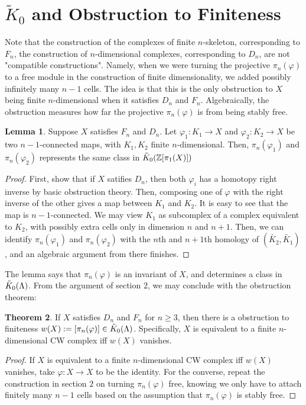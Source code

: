 \documentclass{article}
\theoremstyle{definition}
\newtheorem{theorem}{Theorem}[section]
\theoremstyle{definition}
\theoremstyle{definition}
\theoremstyle{definition}
\theoremstyle{definition}
\newtheorem{lemma}[theorem]{Lemma}
\theoremstyle{definition}
\theoremstyle{definition}
\begin{document}
\section{$\tilde{K}_0$ and Obstruction to Finiteness}


Note that the construction of the complexes of finite $n$-skeleton, corresponding to $F_n$, the construction of $n$-dimensional complexes, corresponding to $D_n$, are not "compatible constructions". Namely, when we were turning the projective $\pi_n(\varphi)$ to a free module in the construction of finite dimensionality, we added possibly infinitely many $n-1$ cells. The idea is that this is the only obstruction to $X$ being finite $n$-dimensional when it satisfies $D_n$ and $F_n$. Algebraically, the obstruction measures how far the projective $\pi_n(\varphi)$ is from being stably free.

\begin{tcolorbox}
\begin{lemma}
Suppose $X$ satisfies $F_n$ and $D_n$. Let $\varphi_1: K_1\to X$ and $\varphi_2: K_2\to X$ be two $n-1$-connected maps, with $K_1,K_2$ finite $n$-dimensional. Then, $\pi_n(\varphi_1)$ and $\pi_n(\varphi_2)$ represents the same class in $\Tilde{K}_0(\mathbb{Z}[\pi_1(X)])$
\end{lemma}
\end{tcolorbox}
\begin{proof}
  First, show that if $X$ satifies $D_n$, then both $\varphi_i$ has a homotopy right inverse by basic obstruction theory. Then, composing one of $\varphi$ with the right inverse of the other gives a map between $K_1$ and $K_2$. It is easy to see that the map is $n-1$-connected. We may view $K_1$ as subcomplex of a complex equivalent to $K_2$, with possibly extra cells only in dimension $n$ and $n+1$. Then, we can identify $\pi_n(\varphi_1)$ and $\pi_n(\varphi_2)$ with the $n$th and $n+1$th homology of $(\tilde{K_2},\tilde{K_1})$, and an algebraic argument from there finishes. 
\end{proof}

The lemma says that $\pi_n(\varphi)$ is an invariant of $X$, and determines a class in $\Tilde{K}_0(\Lambda)$. From the argument of section $2$, we may conclude with the obstruction theorem:
\begin{tcolorbox}[colback=red!5!white,colframe=red!30!white]
\begin{theorem}
If $X$ satisfies $D_n$ and $F_n$ for $n\geq 3$, then there is a obstruction to finiteness $w(X):=[\pi_n(\varphi)]\in \Tilde{K}_0(\Lambda)$. Specifically, $X$ is equivalent to a finite $n$-dimensional CW complex iff $w(X)$ vanishes.  
\end{theorem}
\end{tcolorbox}
\begin{proof}
  If $X$ is equivalent to a finite $n$-dimensional CW complex iff $w(X)$ vanishes, take $\varphi: X\to X$ to be the identity. For the converse, repeat the construction in section $2$ on turning $\pi_n(\varphi)$ free, knowing we only have to attach finitely many $n-1$ cells based on the assumption that $\pi_n(\varphi)$ is stably free. 
\end{proof}
\end{document}

